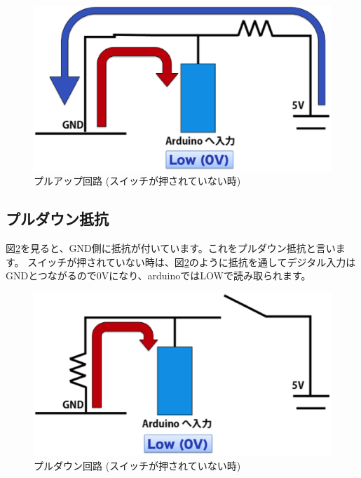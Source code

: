 \documentclass[11pt,a4paper]{jarticle}
\begin{document}
 \begin{figure}[htbp]
  \centering
  \includegraphics[width=0.6\columnwidth]{img/pullup_on.eps}
  \caption{プルアップ回路 (スイッチが押されていない時) }
  \label{fig:pullupSwitchOn}
\end{figure}


 
\subsection{プルダウン抵抗}
 図\ref{fig:pulldownSwitchOff}を見ると、GND側に抵抗が付いています。これをプルダウン抵抗と言います。
 スイッチが押されていない時は、図\ref{fig:pulldownSwitchOff}のように抵抗を通してデジタル入力はGNDとつながるので0Vになり、arduinoではLOWで読み取られます。
\begin{figure}[htbp]
  \centering
  \includegraphics[width=0.6\columnwidth]{img/pulldown_off.eps}
  \caption{プルダウン回路 (スイッチが押されていない時) }
  \label{fig:pulldownSwitchOff}
\end{figure}
\end{document}
